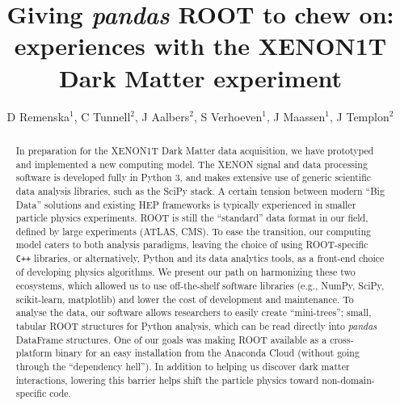 \documentclass[a4paper]{jpconf}
\begin{document}
\def\code#1{\texttt{#1}}
\title{Giving \textit{pandas} ROOT to chew on: experiences with the XENON1T Dark Matter experiment}

\author{D Remenska$^{1}$, C Tunnell$^{2}$, J Aalbers$^{2}$, S Verhoeven$^{1}$, J Maassen$^{1}$, \newline J Templon$^{2}$}
\address{$^{1}$Netherlands eScience Center, Science Park 140, Amsterdam, The 
Netherlands}
\address{$^{2}$National Institute for High Energy Physics (NIKHEF), Science 
Park 
105, Amsterdam, The Netherlands}

\begin{abstract}
In preparation for the XENON1T Dark Matter data acquisition, 
we have prototyped and implemented a new computing model. 
The XENON signal and data processing software is developed fully in Python 3, and makes extensive use of generic scientific data analysis libraries, such as the SciPy stack.
A certain tension between modern ``Big Data'' solutions and 
existing HEP frameworks is typically experienced in smaller particle physics experiments.
ROOT is still the ``standard'' data format in our field, defined by large experiments (ATLAS, CMS).
To ease the transition, our computing model caters to both analysis paradigms, leaving the choice of using ROOT-specific \texttt{C++} libraries, 
or alternatively, Python and its data analytics tools, as a front-end choice
of developing physics algorithms. 
We present our path on harmonizing these two ecosystems, which allowed us to use off-the-shelf software libraries
(e.g., NumPy, SciPy, scikit-learn, matplotlib) and lower the cost of development and maintenance. 
To analyse the data, our software allows researchers to easily create ``mini-trees'';
small, tabular ROOT structures for Python analysis, which can be read directly into \textit{pandas}
DataFrame structures. One of our goals was making ROOT available as a cross-platform binary for an easy
installation from the Anaconda Cloud (without going through the ``dependency hell'').
In addition to helping us discover dark matter interactions, lowering this barrier helps shift the particle physics
toward non-domain-specific code.


\end{abstract}
\end{document}
